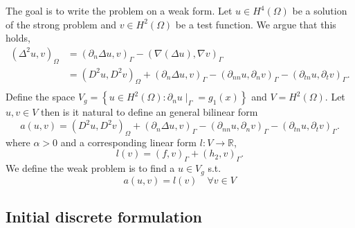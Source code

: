 The goal is to write the problem on a weak form.
Let $u \in H^{4}( \Omega ) $ be a solution of the strong problem and $v \in H^{2}( \Omega ) $ be a test function. We argue that this holds,
    \[
        \begin{split}
(\Delta ^2u,v )_{\Omega } & = ( \partial _{n} \Delta u, v)_{\Gamma } - ( \nabla ( \Delta u) , \nabla v) _{\Gamma } \\
&= ( D^2u, D^2v)_{\Omega } + ( \partial _{n} \Delta u ,v)_{\Gamma } - ( \partial _{nn} u, \partial _{n}v)_{\Gamma } - ( \partial _{tn} u, \partial _{t} v)_{\Gamma }.        \\
        \end{split}
    \]
    Define the space $V_{g} = \left\{ u \in H^{2}( \Omega ) :  \partial _{n}u  \mid _{\Gamma } = g_1(x )  \right \} $ and $V = H^2( \Omega ) $.
    Let $u,v \in V$ then is it natural to define an general bilinear form  \[
    a( u,v) = ( D^2u, D^2v)_{\Omega } + ( \partial _{n} \Delta u ,v)_{\Gamma } - ( \partial _{nn} u, \partial _{n}v)_{\Gamma } - ( \partial _{tn} u, \partial _{t} v)_{\Gamma }.
    \]
    where $\alpha >0$ and a corresponding linear form $l: V \to \mathbb{R} $,
    \[
    l( v) = ( f ,v)_{\Gamma } +  ( h_{2},v)_{\Gamma } .
    \]
    We define the weak problem is to find a $u \in  V_{g}$ s.t. \[
    a( u,v) = l(v) \quad  \forall v \in V_{}
    \]

\subsection{Initial discrete formulation}%
\label{sub:initial_discrete_formulation}

